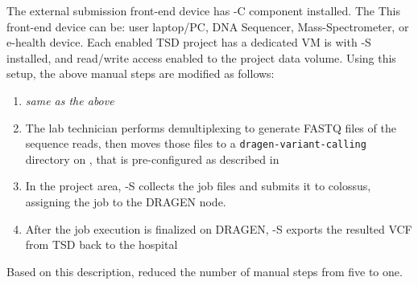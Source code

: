 The external submission front-end device has \name-C component installed. The This front-end device can be: user laptop/PC, DNA Sequencer, Mass-Spectrometer, or e-health device. Each \name enabled TSD project has a dedicated VM is with \name-S installed, and read/write access enabled to the project data volume. Using this setup, the above manual steps are modified as follows:
\begin{enumerate}
	\item \textit{same as the above}
	\item The lab technician performs demultiplexing to generate FASTQ files of the sequence reads, then moves those files to a \texttt{dragen-variant-calling} directory on \name \fs, that is pre-configured as described in  
	\item In the project area, \name-S collects the job files and submits it to colossus, assigning the job to the DRAGEN node. 
	\item After the job execution is finalized on DRAGEN, \name-S exports the resulted VCF from TSD back to the hospital
\end{enumerate}

Based on this description, \name reduced the number of manual steps from five to one.



